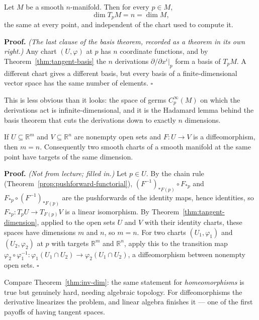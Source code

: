 \documentclass[11pt]{report}
\makeatletter
\newcounter{thmcounter}[section]
\renewenvironment{proof}[1][Proof]{\noindent\textbf{#1.} }{\hfill$\square$\par\vspace{5pt}}
\newcommand{\thmlabel}[1]{\edef\@currentlabel{\arabic{section}.\arabic{thmcounter}}\label{#1}}
\makeatother
\begin{document}
\begin{thmbox}\thmlabel{thm:tangent-dimension}
Let $M$ be a smooth $n$-manifold. Then for every $p \in M$,
\[
\dim T_pM = n = \dim M ,
\]
the same at every point, and independent of the chart used to compute it.
\end{thmbox}

\begin{proof}
\textit{(The last clause of the basis theorem, recorded as a theorem in its own right.)} Any chart $(U, \varphi)$ at $p$ has $n$ coordinate functions, and by Theorem~\ref{thm:tangent-basis} the $n$ derivations $\partial/\partial x^i|_p$ form a basis of $T_pM$. A different chart gives a different basis, but every basis of a finite-dimensional vector space has the same number of elements.
\end{proof}

This is less obvious than it looks: the space of germs $C^\infty_p(M)$ on which the derivations act is infinite-dimensional, and it is the Hadamard lemma behind the basis theorem that cuts the derivations down to exactly $n$ dimensions.

\begin{corbox}\thmlabel{cor:smooth-invariance-dim}
If $U \subseteq \mathbb{R}^m$ and $V \subseteq \mathbb{R}^n$ are nonempty open sets and $F : U \to V$ is a diffeomorphism, then $m = n$. Consequently two smooth charts of a smooth manifold at the same point have targets of the same dimension.
\end{corbox}

\begin{proof}
\textit{(Not from lecture; filled in.)} Let $p \in U$. By the chain rule (Theorem~\ref{prop:pushforward-functorial}), $(F^{-1})_{*F(p)} \circ F_{*p}$ and $F_{*p} \circ (F^{-1})_{*F(p)}$ are the pushforwards of the identity maps, hence identities, so $F_{*p} : T_pU \to T_{F(p)}V$ is a linear isomorphism. By Theorem~\ref{thm:tangent-dimension}, applied to the open sets $U$ and $V$ with their identity charts, these spaces have dimensions $m$ and $n$, so $m = n$. For two charts $(U_1, \varphi_1)$ and $(U_2, \varphi_2)$ at $p$ with targets $\mathbb{R}^m$ and $\mathbb{R}^n$, apply this to the transition map $\varphi_2 \circ \varphi_1^{-1} : \varphi_1(U_1 \cap U_2) \to \varphi_2(U_1 \cap U_2)$, a diffeomorphism between nonempty open sets.
\end{proof}

Compare Theorem~\ref{thm:inv-dim}: the same statement for \emph{homeomorphisms} is true but genuinely hard, needing algebraic topology. For diffeomorphisms the derivative linearizes the problem, and linear algebra finishes it --- one of the first payoffs of having tangent spaces.
\end{document}

